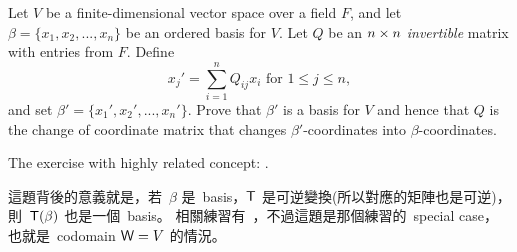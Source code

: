 \begin{exercise} \label{exercise 2.5.13}
\sloppy Let \(V\) be a finite-dimensional vector space over a field \(F\), and let \(\beta = \{ x_1, x_2, ..., x_n \}\) be an ordered basis for \(V\).
Let \(Q\) be an \(n \times n\) \emph{invertible} matrix with entries from \(F\).
Define
\[
    x_j' = \sum_{i = 1}^n Q_{ij} x_i \text{ for } 1 \le j \le n,
\]
and set \(\beta' = \{ x_1', x_2', ..., x_n' \}\).
Prove that \(\beta'\) is a basis for \(V\) and hence that \(Q\) is the change of coordinate matrix that changes \(\beta'\)-coordinates into \(\beta\)-coordinates.
\end{exercise}

\begin{note}
The exercise with highly related concept: .
\end{note}

\begin{note}
這題背後的意義就是，若\ \(\beta\) 是\ basis，\(\textsf{T}\) 是可逆變換(所以對應的矩陣也是可逆)，則\ \(\textsf{T}(\beta)\) 也是一個\ basis。
相關練習有\ ，不過這題是那個練習的\ special case，也就是\ codomain \(\textsf{W} = V\) 的情況。
\end{note}

